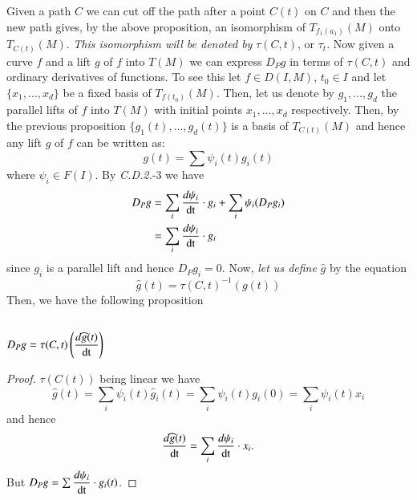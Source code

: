 Given a path $C$ we can cut off the path after a point $C(t)$ on $C$
and then the new path gives, by the above proposition, an isomorphism
of $T_{f_{1}(a_{1})}(M)$ onto $T_{C(t)}(M)$. {\em This isomorphism
  will be denoted by} $\tau(C,t)$, or $\tau_{t}$. Now given a curve
$f$ and a lift $g$ of $f$ into $T(M)$ \pageoriginale we can express
$D_{P}g$ in terms of $\tau(C,t)$ and ordinary derivatives of
functions. To see this let $f\in D(I,M)$, $t_{0}\in I$ and let
$\{x_{1},\ldots,x_{d}\}$ be a fixed basis of $T_{f(t_{0})}(M)$. Then,
let us denote by $g_{1},\ldots,g_{d}$ the parallel lifts of $f$ into
$T(M)$ with initial points $x_{1},\ldots,x_{d}$ respectively. Then, by
the previous proposition $\{g_{1}(t),\ldots,g_{d}(t)\}$ is a basis of
$T_{C(t)}(M)$ and hence any lift $g$ of $f$ can be written as:
\begin{equation*}
g(t)=\sum\psi_{i}(t)g_{i}(t)\tag{2.7.8}\label{chap2:2.7.8}
\end{equation*}
where $\psi_{i}\in F(I)$. By {\em C.D.2.}-3 we have
\begin{align*}
D_{P}g &= \sum_{i}\frac{d\psi_{i}}{\operatorname{dt}}\cdot
g_{i}+\sum_{i}\psi_{i}(D_{P}g_{i})\\
&=\sum_{i}\frac{d\psi_{i}}{\operatorname{dt}}\cdot g_{i}
\end{align*}
since $g_{i}$ is a parallel lift and hence $D_{P}g_{i}=0$. Now, {\em
  let us define} $\widehat{g}$ by the equation
\begin{equation*}
\widehat{g}(t)=\tau(C,t)^{-1}(g(t))\tag{2.7.9}\label{chap2:2.7.9}
\end{equation*}
Then, we have the following proposition

\setcounter{subsection}{9}

\subsection{}\label{chap2:2.7.10}

\begin{prop*}%
$D_{P}g=\tau(C,t)\left(\dfrac{d\widehat{g}(t)}{\operatorname{dt}}\right)$
\end{prop*}

\begin{proof}
$\tau(C(t))$ being linear we have
$$
\widehat{g}(t)=\sum_{i}\psi_{i}(t)\widehat{g}_{i}(t)=\sum_{i}\psi_{i}(t)g_{i}(0)=\sum_{i}\psi_{i}(t)x_{i} 
$$
and hence
$$
\frac{d\widehat{g}(t)}{\operatorname{dt}}=\sum_{i}\frac{d\psi_{i}}{\operatorname{dt}}\cdot x_{i}.
$$
But $D_{P}g=\sum \dfrac{d\psi_{i}}{\operatorname{dt}}\cdot g_{i}(t)$.
\end{proof}

